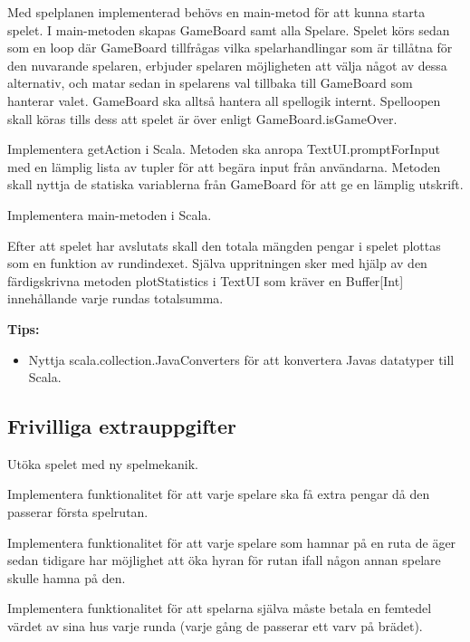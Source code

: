 \Task Med spelplanen implementerad behövs en main-metod för att kunna starta spelet. I main-metoden skapas GameBoard samt alla Spelare. Spelet körs sedan som en loop där GameBoard tillfrågas vilka spelarhandlingar som är tillåtna för den nuvarande spelaren, erbjuder spelaren möjligheten att välja något av dessa alternativ, och matar sedan in spelarens val tillbaka till GameBoard som hanterar valet. GameBoard ska alltså hantera all spellogik internt.  Spelloopen skall köras tills dess att spelet är över enligt GameBoard.isGameOver.

\Subtask Implementera getAction i Scala. Metoden ska anropa TextUI.promptForInput med en lämplig lista av tupler för att begära input från användarna. Metoden skall nyttja de statiska variablerna från GameBoard för att ge en lämplig utskrift.

\Subtask Implementera main-metoden i Scala.

\Subtask Efter att spelet har avslutats skall den totala mängden pengar i spelet plottas som en funktion av rundindexet. Själva uppritningen sker med hjälp av den färdigskrivna metoden plotStatistics i TextUI som kräver en Buffer[Int] innehållande varje rundas totalsumma. 

\textbf{Tips:}
\begin{itemize}
\item Nyttja scala.collection.JavaConverters för att konvertera Javas datatyper till Scala.
\end{itemize}

\subsection{Frivilliga extrauppgifter}

\Task Utöka spelet med ny spelmekanik.

\Subtask Implementera funktionalitet för att varje spelare ska få extra pengar då den passerar första spelrutan.

\Subtask Implementera funktionalitet för att varje spelare som hamnar på en ruta de äger sedan tidigare har möjlighet att öka hyran för rutan ifall någon annan spelare skulle hamna på den.

\Subtask Implementera funktionalitet för att spelarna själva måste betala en femtedel värdet av sina hus varje runda (varje gång de passerar ett varv på brädet).
    
